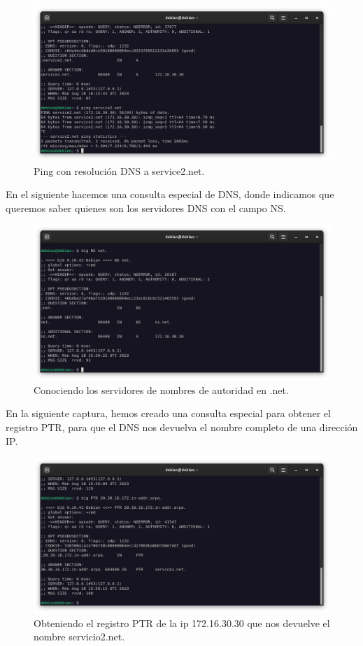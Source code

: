 \begin{figure}[H]
	\centering
	\includegraphics[scale=0.30]{12}
	\caption{Ping con resolución DNS a service2.net.}
\end{figure}

En el siguiente hacemos una consulta especial de DNS, donde indicamos que queremos saber quienes son los servidores DNS con el campo NS.

\begin{figure}[H]
	\centering
	\includegraphics[scale=0.30]{13}
	\caption{Conociendo los servidores de nombres de autoridad en .net.}
\end{figure}

En la siguiente captura, hemos creado una consulta especial para obtener el registro PTR, para que el DNS nos devuelva el nombre completo de una dirección IP.

\begin{figure}[H]
	\centering
	\includegraphics[scale=0.30]{14}
	\caption{Obteniendo el registro PTR de la ip 172.16.30.30 que nos devuelve el nombre servicio2.net.}
\end{figure}

